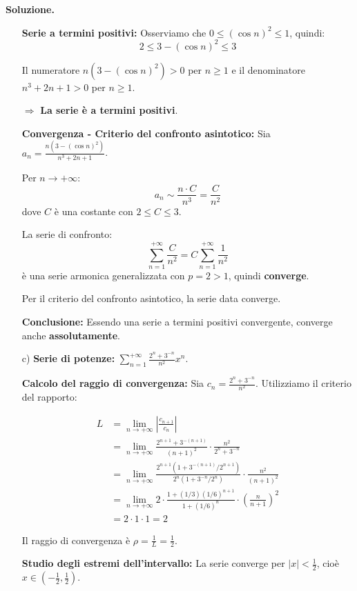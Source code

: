 \documentclass[12pt, a4paper]{article}
\newenvironment{solution}{%
    \par\noindent\textbf{Soluzione.}\medskip\par
    \normalfont
}{\par\bigskip}
\begin{document}
\begin{solution}
\begin{enumerate}
    \textbf{Serie a termini positivi:}
    Osserviamo che $0 \leq (\cos n)^2 \leq 1$, quindi:
    \[2 \leq 3-(\cos n)^2 \leq 3\]
    
    Il numeratore $n(3-(\cos n)^2) > 0$ per $n \geq 1$ e il denominatore $n^3+2n+1 > 0$ per $n \geq 1$.
    
    $\Rightarrow$ \textbf{La serie è a termini positivi}.
    
    \textbf{Convergenza - Criterio del confronto asintotico:}
    Sia $a_n = \frac{n(3-(\cos n)^{2})}{n^{3}+2n+1}$.
    
    Per $n \to +\infty$:
    \[a_n \sim \frac{n \cdot C}{n^3} = \frac{C}{n^2}\]
    dove $C$ è una costante con $2 \leq C \leq 3$.
    
    La serie di confronto:
    \[\sum_{n=1}^{+\infty} \frac{C}{n^2} = C \sum_{n=1}^{+\infty} \frac{1}{n^2}\]
    è una serie armonica generalizzata con $p = 2 > 1$, quindi \textbf{converge}.
    
    Per il criterio del confronto asintotico, la serie data converge.
    
    \textbf{Conclusione:} Essendo una serie a termini positivi convergente, converge anche \textbf{assolutamente}.

    \item[c)] \textbf{Serie di potenze:} $\displaystyle\sum_{n=1}^{+\infty} \frac{2^{n}+3^{-n}}{n^{2}}x^{n}$.
    
    \textbf{Calcolo del raggio di convergenza:}
    Sia $c_n = \frac{2^{n}+3^{-n}}{n^{2}}$. Utilizziamo il criterio del rapporto:
    
    \begin{align}
        L &= \lim_{n\to+\infty} \left|\frac{c_{n+1}}{c_n}\right| \\
        &= \lim_{n\to+\infty} \frac{2^{n+1}+3^{-(n+1)}}{(n+1)^2} \cdot \frac{n^2}{2^n+3^{-n}} \\
        &= \lim_{n\to+\infty} \frac{2^{n+1}(1+3^{-(n+1)}/2^{n+1})}{2^n(1+3^{-n}/2^n)} \cdot \frac{n^2}{(n+1)^2} \\
        &= \lim_{n\to+\infty} 2 \cdot \frac{1+(1/3)(1/6)^{n+1}}{1+(1/6)^n} \cdot \left(\frac{n}{n+1}\right)^2 \\
        &= 2 \cdot 1 \cdot 1 = 2
    \end{align}
    
    Il raggio di convergenza è $\rho = \frac{1}{L} = \frac{1}{2}$.
    
    \textbf{Studio degli estremi dell'intervallo:}
    La serie converge per $|x| < \frac{1}{2}$, cioè $x \in \left(-\frac{1}{2}, \frac{1}{2}\right)$.
    

\end{enumerate}
\end{solution}
\end{document}
